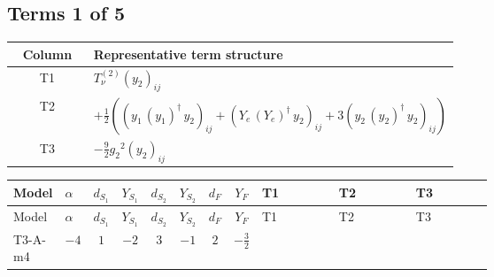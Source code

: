 \documentclass[8pt]{article}
\begin{document}
\begin{landscape}
\subsection*{Terms 1 of 5}
\begin{center}
\begin{tabular}{@{}c >{\raggedright\arraybackslash}p{0.82\linewidth}@{}}
\toprule
Column & Representative term structure \\
\midrule
T1 & \(\displaystyle T_{\nu}^{(2)} \left({y_2}\right)_{ij}\) \\
\midrule
T2 & \(\displaystyle +\frac{1}{2} (\left({y_1}\,\left({y_1}\right)^{\dagger}\,{y_2}\right)_{ij}+\left({Y_e}\,\left({Y_e}\right)^{\dagger}\,{y_2}\right)_{ij}+3 \left({y_2}\,\left({y_2}\right)^{\dagger}\,{y_2}\right)_{ij})\) \\
\midrule
T3 & \(\displaystyle -\frac{9}{2} {g_2}^2 \left({y_2}\right)_{ij}\) \\
\midrule
\bottomrule
\end{tabular}
\end{center}
\smallskip
\tiny
\begin{longtable}{@{}llcccccc >{\raggedright\arraybackslash}p{0.21\linewidth} >{\raggedright\arraybackslash}p{0.21\linewidth} >{\raggedright\arraybackslash}p{0.21\linewidth}@{}}
\toprule
Model & $\alpha$ & $d_{S_1}$ & $Y_{S_1}$ & $d_{S_2}$ & $Y_{S_2}$ & $d_F$ & $Y_F$ & T1 & T2 & T3 \\
\midrule
\endfirsthead
\toprule
Model & $\alpha$ & $d_{S_1}$ & $Y_{S_1}$ & $d_{S_2}$ & $Y_{S_2}$ & $d_F$ & $Y_F$ & T1 & T2 & T3 \\
\midrule
\endhead
T3-A-m4 & $-4$ & $1$ & $-2$ & $3$ & $-1$ & $2$ & $-\frac{3}{2}$ & \scriptsize\adjustbox{max width=\linewidth}{$\begin{gathered} T_{\nu}^{(2)} \left({y_2}\right)_{ij}\end{gathered}$} & \scriptsize\adjustbox{max width=\linewidth}{$\begin{gathered} +\frac{1}{2} (\left({y_1}\,\left({y_1}\right)^{\dagger}\,{y_2}\right)_{ij}+\left({Y_e}\,\left({Y_e}\right)^{\dagger}\,{y_2}\right)_{ij}+3 \left({y_2}\,\left({y_2}\right)^{\dagger}\,{y_2}\right)_{ij})\end{gathered}$} & \scriptsize\adjustbox{max width=\linewidth}{$\begin{gathered} -\frac{9}{2} {g_2}^2 \left({y_2}\right)_{ij}\end{gathered}$} \\
\midrule

\end{longtable}
\end{landscape}
\end{document}
